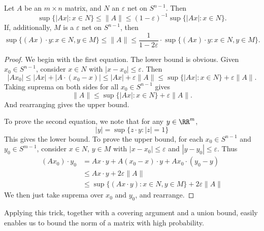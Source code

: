 \begin{lemma}
    Let $A$ be an $m \times n$ matrix, and $N$ an $\varepsilon$ net on $S^{n-1}$. Then
    \[ \sup \{ |Ax| : x \in N \} \leq \| A \| \leq (1 - \varepsilon)^{-1} \sup \{ |Ax| : x \in N \}. \]
    If, additionally, $M$ is a $\varepsilon$ net on $S^{n-1}$, then
    \[ \sup \{ (Ax) \cdot y : x \in N, y \in M \} \leq \| A \| \leq \frac{1}{1 - 2\varepsilon} \cdot \sup \{ (Ax) \cdot y : x \in N, y \in M \}. \]
\end{lemma}
\begin{proof}
    We begin with the first equation. The lower bound is obvious. Given $x_0 \in S^{n-1}$, consider $x \in N$ with $|x - x_0| \leq \varepsilon$. Then
    \[ |Ax_0| \leq |Ax| + |A \cdot (x_0 - x)| \leq |Ax| + \varepsilon \| A \| \leq \sup \{ |Ax| : x \in N \} + \varepsilon \| A \|. \]
    Taking suprema on both sides for all $x_0 \in S^{n-1}$ gives
    \[ \| A \| \leq \sup \{ |Ax| : x \in N \} + \varepsilon \| A \|.  \]
    And rearranging gives the upper bound.

    To prove the second equation, we note that for any $y \in \RR^m$,
    \[ |y| = \sup \{ z \cdot y : |z| = 1 \} \]
    This gives the lower bound. To prove the upper bound, for each $x_0 \in S^{n-1}$ and $y_0 \in S^{m-1}$, consider $x \in N$, $y \in M$ with $|x - x_0| \leq \varepsilon$ and $|y - y_0| \leq \varepsilon$. Thus
    \begin{align*}
        (Ax_0) \cdot y_0 &= Ax \cdot y + A(x_0 - x) \cdot y + Ax_0 \cdot (y_0 - y)\\
        &\leq Ax \cdot y + 2\varepsilon \| A \|\\
        &\leq \sup \{ (Ax \cdot y) : x \in N, y \in M \} + 2\varepsilon \| A \|
    \end{align*}
    We then just take suprema over $x_0$ and $y_0$, and rearrange.
\end{proof}

Applying this trick, together with a covering argument and a union bound, easily enables us to bound the norm of a matrix with high probability.


